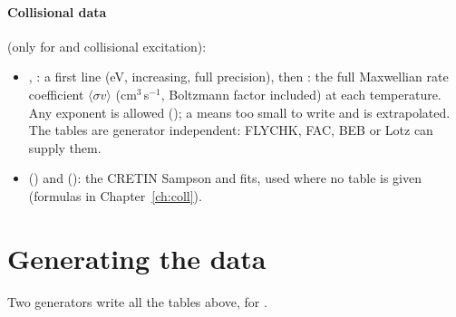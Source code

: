 \paragraph{Collisional data} (only for  and collisional excitation):
\begin{itemize}
  \item {}, : a first line
     (eV, increasing, full precision), then : the full Maxwellian
    rate coefficient $\langle\sigma v\rangle$ (cm$^3$\,s$^{-1}$, Boltzmann factor included) at each temperature.
    Any exponent is allowed (); a  means too small to write and is extrapolated.
    The tables are generator independent: FLYCHK, FAC, BEB or Lotz can supply them.
  \item {} () and
     (): the CRETIN Sampson and  fits,
    used where no table is given (formulas in Chapter~\ref{ch:coll}).
\end{itemize}

\section{Generating the data}
\label{sec:generators}

Two generators write all the tables above, for .

